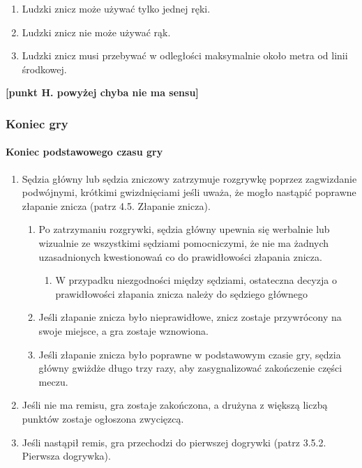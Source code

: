 \documentclass[12pt]{article}
\begin{document}
\begin{enumerate}
\begin{enumerate}
\item Ludzki znicz może używać tylko jednej ręki.

\item Ludzki znicz nie może używać rąk.

\item Ludzki znicz musi przebywać w odległości maksymalnie około metra od
linii środkowej.
\end{enumerate}
\end{enumerate}

\textbf{[punkt H. powyżej chyba nie ma sensu]}

\subsubsection{Koniec gry}

\paragraph{Koniec podstawowego czasu gry}
\begin{enumerate}
\item Sędzia główny lub sędzia zniczowy zatrzymuje rozgrywkę poprzez
zagwizdanie podwójnymi, krótkimi gwizdnięciami jeśli uważa, że mogło
nastąpić poprawne złapanie znicza (patrz 4.5. Złapanie znicza).
\begin{enumerate}
\item Po zatrzymaniu rozgrywki, sędzia główny upewnia się werbalnie lub
wizualnie ze wszystkimi sędziami pomocniczymi, że nie ma żadnych
uzasadnionych kwestionowań co do prawidłowości złapania znicza.

\begin{enumerate}
\item
    W przypadku niezgodności między sędziami, ostateczna decyzja o
  prawidłowości złapania znicza należy do sędziego głównego
  \end{enumerate}

\item Jeśli złapanie znicza było nieprawidłowe, znicz zostaje przywrócony
na swoje miejsce, a gra zostaje wznowiona.

\item Jeśli złapanie znicza było poprawne w podstawowym czasie gry,
sędzia główny gwiżdże długo trzy razy, aby zasygnalizować zakończenie
części meczu.
\end{enumerate}

\item Jeśli nie ma remisu, gra zostaje zakończona, a drużyna z większą
liczbą punktów zostaje ogłoszona zwycięzcą.

\item Jeśli nastąpił remis, gra przechodzi do pierwszej dogrywki (patrz
3.5.2. Pierwsza dogrywka).
\end{enumerate}
\end{document}
